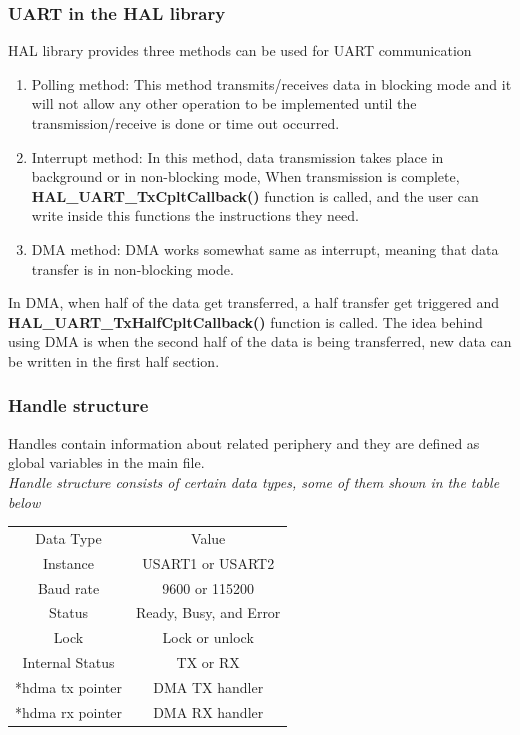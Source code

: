 \subsubsection{UART in the HAL library}
HAL library provides three methods can be used for UART communication
\begin{enumerate}
    \item Polling method: This method transmits/receives data in blocking mode and it will not allow any other operation to be implemented until the transmission/receive is done or time out occurred.
    \item Interrupt method: In this method, data transmission takes place in background or in non-blocking mode, When transmission is complete,\\ \textbf{HAL\_UART\_TxCpltCallback()} function is called, and the user can write inside this functions the instructions they need.
    \item DMA method: DMA works somewhat same as interrupt, meaning that data transfer is in non-blocking mode.\\

\end{enumerate}

In DMA, when half of the data get transferred, a half transfer get triggered and \textbf{HAL\_UART\_TxHalfCpltCallback()} function is called. The idea behind using DMA is when the second half of the data is being transferred, new data can be written in the first half section.

\subsubsection{Handle structure}

Handles contain information about related periphery and they are defined as global variables in the main file.\\

\emph{Handle structure consists of certain data types, some of them shown in the table below}

\begin{table}[h]
\def\arraystretch{1.5}
\centering
\begin{tabular}{| c | c |}
\hline
\cellcolor[HTML]{B4C6E7}Data   Type & \cellcolor[HTML]{B4C6E7}Value\\
Instance                            & USART1 or USART2\\
\hline
Baud rate                           & 9600 or 115200 \\
\hline
Status                              & Ready, Busy, and Error \\
\hline
Lock                                & Lock or unlock\\
\hline
Internal Status                     & TX or RX \\
\hline
*hdma tx pointer                    & DMA TX handler\\
\hline
*hdma rx pointer                    & DMA RX handler\\
\hline

\end{tabular}
\end{table}

